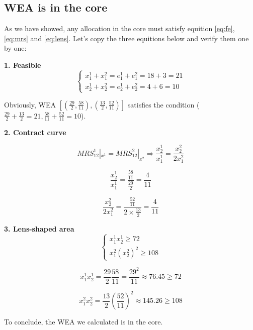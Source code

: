 \documentclass{article}
\begin{document}
\subsection{WEA is in the core}

As we have showed, any allocation in the core must satisfy equition \ref{eq:fe}, \ref{eq:mrs} and \ref{eq:lens}. Let's copy the three equitions below and verify them one by one:

\vspace{2mm}

\textbf{1. Feasible}
\begin{equation}
    \begin{cases}
x^1_1+x^2_1= e^1_1 +e^2_1 = 18+3 =21 \\
x^1_2+x^2_2= e^1_2 +e^2_2 = 4+6 =10
    \end{cases}
\nonumber
\end{equation}

Obviously, WEA $[(\frac{29}{2},\frac{58}{11} ),(\frac{13}{2},\frac{52}{11})]$ satisfies the condition
($\frac{29}{2}+\frac{13}{2}=21,\frac{58}{11} +\frac{52}{11}=10$).

\vspace{2mm}

\textbf{2. Contract curve}

\begin{equation}
MRS^1_{12} |_{x^1} = MRS^2_{12}|_{x^2} \Rightarrow
\frac{x^1_2}{x^1_1} = \frac{x^2_2}{2x^2_1}
\nonumber
\end{equation}

$$\frac{x^1_2}{x^1_1} = \frac{\frac{58}{11}}{\frac{29}{2}} = \frac{4}{11}$$

$$\frac{x^2_2}{2x^2_1} = \frac{\frac{52}{11}}{2 \times \frac{13}{2}}= \frac{4}{11}$$

\vspace{2mm}

\textbf{3. Lens-shaped area}
\begin{equation}
    \begin{cases}
x^1_1 x^1_2 \ge 72 \\
x^2_1 (x^2_2)^2 \ge 108    \end{cases}
\nonumber
\end{equation}

$$x^1_1 x^1_2 = \frac{29}{2} \frac{58}{11} = \frac{29^2}{11} \approx 76.45 \ge 72$$

$$x^2_1 x^2_2 = \frac{13}{2} (\frac{52}{11})^2  \approx 145.26 \ge 108$$

To conclude, the WEA we calculated is in the core.
\end{document}
